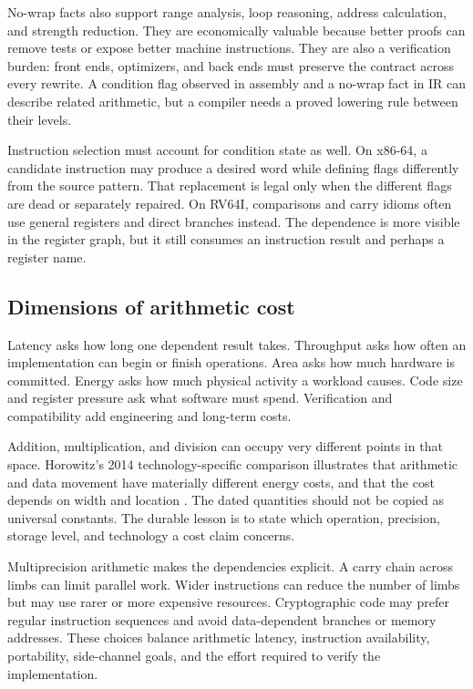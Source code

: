 No-wrap facts also support range analysis, loop reasoning, address
calculation, and strength reduction. They are economically valuable because
better proofs can remove tests or expose better machine instructions. They are
also a verification burden: front ends, optimizers, and back ends must preserve
the contract across every rewrite. A condition flag observed in assembly and
a no-wrap fact in IR can describe related arithmetic, but a compiler needs a
proved lowering rule between their levels.

Instruction selection must account for condition state as well. On x86-64, a
candidate instruction may produce a desired word while defining flags
differently from the source pattern. That replacement is legal only when the
different flags are dead or separately repaired. On RV64I, comparisons and
carry idioms often use general registers and direct branches instead. The
dependence is more visible in the register graph, but it still consumes an
instruction result and perhaps a register name.

\subsection{Dimensions of arithmetic cost}

Latency asks how long one dependent result takes. Throughput asks how often an
implementation can begin or finish operations. Area asks how much hardware is
committed. Energy asks how much physical activity a workload causes. Code size
and register pressure ask what software must spend. Verification and
compatibility add engineering and long-term costs.

Addition, multiplication, and division can occupy very different points in
that space. Horowitz's 2014 technology-specific comparison illustrates that
arithmetic and data movement have materially different energy costs, and that
the cost depends on width and location \autocite{horowitz2014energy}. The
dated quantities should not be copied as universal constants. The durable
lesson is to state which operation, precision, storage level, and technology a
cost claim concerns.

Multiprecision arithmetic makes the dependencies explicit. A carry chain
across limbs can limit parallel work. Wider instructions can reduce the number
of limbs but may use rarer or more expensive resources. Cryptographic code may
prefer regular instruction sequences and avoid data-dependent branches or
memory addresses. These choices balance arithmetic latency, instruction
availability, portability, side-channel goals, and the effort required to
verify the implementation.

